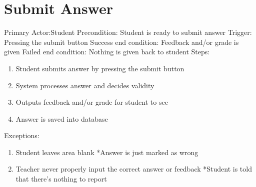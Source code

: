     \section{Submit Answer}
        Primary Actor:Student \newline
        Precondition: Student is ready to submit answer \newline
        Trigger: Pressing the submit button \newline
        Success end condition: Feedback and/or grade is given       \newline
        Failed end condition: Nothing is given back to student      \newline
        \newline
        Steps:
        \begin{enumerate}
            \item{Student submits answer by pressing the submit             button}
            \item{System processes answer and decides validity}
            \item{Outputs feedback and/or grade for student to see}
            \item{Answer is saved into database}
        \end{enumerate}
        Exceptions:
        \begin{enumerate}
            \item{Student leaves area blank \newline
        	*Answer is just marked as wrong}
        	\addtocounter{enumi}{1}
            \item{Teacher never properly input the correct answer or     feedback \newline
        	*Student is told that there's nothing to report}
        \end{enumerate}

    
